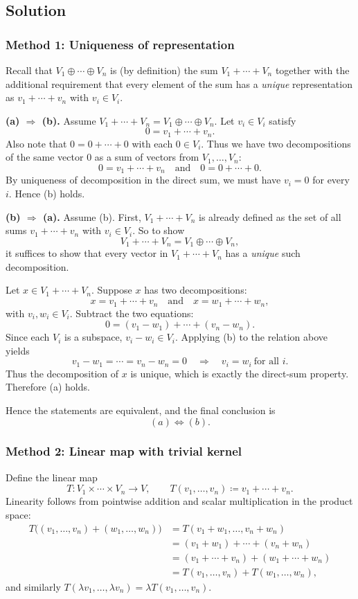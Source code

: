 \documentclass[12pt]{article}
\begin{document}
\subsection{Solution}

\subsubsection{Method 1: Uniqueness of representation}
Recall that \(V_1\oplus\cdots\oplus V_n\) is (by definition) the sum \(V_1+\cdots+V_n\) together with the additional requirement that every element of the sum has a \emph{unique} representation as \(v_1+\cdots+v_n\) with \(v_i\in V_i\).

\textbf{(a) \(\Rightarrow\) (b).}
Assume \(V_1+\cdots+V_n = V_1\oplus\cdots\oplus V_n\).
Let \(v_i\in V_i\) satisfy
\[
0=v_1+\cdots+v_n.
\]
Also note that \(0=0+\cdots+0\) with each \(0\in V_i\).
Thus we have two decompositions of the same vector \(0\) as a sum of vectors from \(V_1,\ldots,V_n\):
\[
0 = v_1+\cdots+v_n
\quad\text{and}\quad
0 = 0+\cdots+0.
\]
By uniqueness of decomposition in the direct sum, we must have \(v_i=0\) for every \(i\).
Hence (b) holds.

\textbf{(b) \(\Rightarrow\) (a).}
Assume (b).
First, \(V_1+\cdots+V_n\) is already defined as the set of all sums \(v_1+\cdots+v_n\) with \(v_i\in V_i\).
So to show
\[
V_1+\cdots+V_n = V_1\oplus\cdots\oplus V_n,
\]
it suffices to show that every vector in \(V_1+\cdots+V_n\) has a \emph{unique} such decomposition.

Let \(x\in V_1+\cdots+V_n\).
Suppose \(x\) has two decompositions:
\[
x=v_1+\cdots+v_n
\quad\text{and}\quad
x=w_1+\cdots+w_n,
\]
with \(v_i,w_i\in V_i\).
Subtract the two equations:
\[
0=(v_1-w_1)+\cdots+(v_n-w_n).
\]
Since each \(V_i\) is a subspace, \(v_i-w_i\in V_i\).
Applying (b) to the relation above yields
\[
v_1-w_1=\cdots=v_n-w_n=0
\quad\Longrightarrow\quad
v_i=w_i\ \text{for all }i.
\]
Thus the decomposition of \(x\) is unique, which is exactly the direct-sum property.
Therefore (a) holds.

Hence the statements are equivalent, and the final conclusion is
\[
\boxed{\ (a)\Longleftrightarrow (b).\ }
\]

\subsubsection{Method 2: Linear map with trivial kernel}
Define the linear map
\[
T: V_1\times\cdots\times V_n \longrightarrow V,
\qquad
T(v_1,\ldots,v_n)\coloneqq v_1+\cdots+v_n.
\]
Linearity follows from pointwise addition and scalar multiplication in the product space:
\begin{align*}
T\bigl((v_1,\ldots,v_n)+(w_1,\ldots,w_n)\bigr)
&=T(v_1+w_1,\ldots,v_n+w_n)\\
&=(v_1+w_1)+\cdots+(v_n+w_n)\\
&=(v_1+\cdots+v_n)+(w_1+\cdots+w_n)\\
&=T(v_1,\ldots,v_n)+T(w_1,\ldots,w_n),
\end{align*}
and similarly \(T(\lambda v_1,\ldots,\lambda v_n)=\lambda T(v_1,\ldots,v_n)\).
\end{document}
